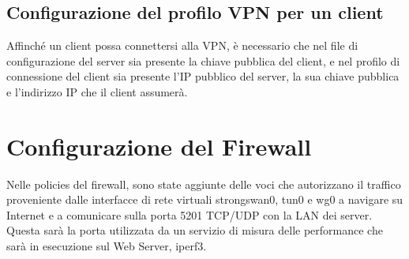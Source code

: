 \subsection{Configurazione del profilo VPN per un client}
Affinché un client possa connettersi alla VPN, è necessario che nel file di configurazione del server sia presente la chiave pubblica del client, e nel profilo di connessione del client sia presente l'IP pubblico del server, la sua chiave pubblica e l'indirizzo IP che il client assumerà.

\section{Configurazione del Firewall}
Nelle policies del firewall, sono state aggiunte delle voci che autorizzano il traffico proveniente dalle interfacce di rete virtuali strongswan0, tun0 e wg0 a navigare su Internet e a comunicare sulla porta 5201 TCP/UDP con la LAN dei server. Questa sarà la porta utilizzata da un servizio di misura delle performance che sarà in esecuzione sul Web Server, iperf3.
